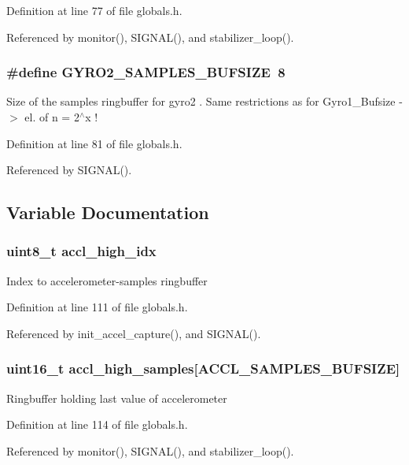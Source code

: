 Definition at line 77 of file globals.h.

Referenced by monitor(), SIGNAL(), and stabilizer\_\-loop().
\subsubsection{\setlength{\rightskip}{0pt plus 5cm}\#define GYRO2\_\-SAMPLES\_\-BUFSIZE~8}\label{group__ro__globals_gf731d86d3d791c39f4de79412c500079}


Size of the samples ringbuffer for gyro2 . Same restrictions as for Gyro1\_\-Bufsize -$>$ el. of n = 2$^\wedge$x ! 

Definition at line 81 of file globals.h.

Referenced by SIGNAL().

\subsection{Variable Documentation}
\subsubsection{\setlength{\rightskip}{0pt plus 5cm}uint8\_\-t {\bf accl\_\-high\_\-idx}}\label{group__ro__globals_g59caa8f8fab6ab60d64f16a87a7b0f43}


Index to accelerometer-samples ringbuffer 

Definition at line 111 of file globals.h.

Referenced by init\_\-accel\_\-capture(), and SIGNAL().
\subsubsection{\setlength{\rightskip}{0pt plus 5cm}uint16\_\-t {\bf accl\_\-high\_\-samples}[ACCL\_\-SAMPLES\_\-BUFSIZE]}\label{group__ro__globals_gb3a23c6a3619f9f782ad505bd5700bc2}


Ringbuffer holding last value of accelerometer 

Definition at line 114 of file globals.h.

Referenced by monitor(), SIGNAL(), and stabilizer\_\-loop().

